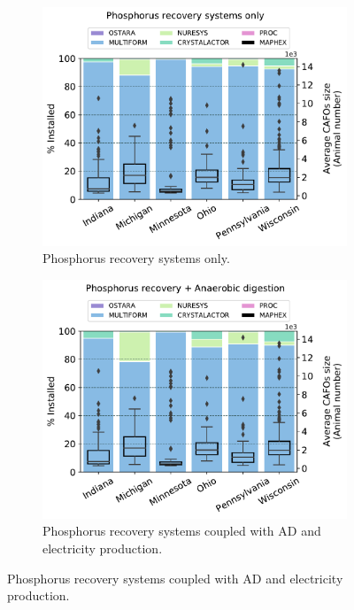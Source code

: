 \begin{refsection}[referencesCh4]
\begin{figure}[h!]
	\centering
	\begin{subfigure}[t]{0.7\linewidth}
		\centering
		\includegraphics[width=\linewidth]{gfx/Chapter4/TechsDistribution_Pcredits22_REC0.pdf} 
		\caption{Phosphorus recovery systems only.}
		\label{fig:PTechs_Distribution_NoAD}
	\end{subfigure}
	\begin{subfigure}[t]{0.7\linewidth}
		\centering
		\includegraphics[width=\linewidth]{gfx/Chapter4/TechsDistribution_Pcredits22_REC60.pdf}
		\caption{Phosphorus recovery systems coupled with AD and electricity production.}
		\label{fig:PTechs_Distribution_AD}
	\end{subfigure}
	

\end{figure}
\end{refsection}

